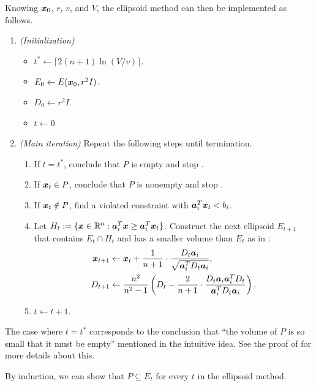 \begin{enumerate}
Knowing \(\bm{x}_0\), \(r\), \(v\), and \(V\), the ellipsoid method can then
be implemented as follows.
\begin{enumerate}[label={(\arabic*)}]
\item \emph{(Initialization)}
\begin{itemize}
\item \(t^{*}\leftarrow\lceil 2(n+1)\ln(V/v)\rceil\).
\item \(E_0\leftarrow E(\bm{x}_0,r^{2}I)\).
\item \(D_0\leftarrow r^{2}I\).
\item \(t\leftarrow 0\).
\end{itemize}
\item \emph{(Main iteration)} Repeat the following steps until termination.
\begin{enumerate}
\item If \(t=t^{*}\), conclude that \(P\) is empty and stop .
\item If \(\bm{x}_t\in P\), conclude that \(P\) is nonempty and stop
.
\item If \(\bm{x}_t\notin P\), find a violated constraint with
\(\bm{a}_i^{T}\bm{x}_t<b_i\).
\item Let
\(H_t:=\{\bm{x}\in\mathbb{R}^n:\bm{a}_i^{T}\bm{x}\ge\bm{a}_i^{T}\bm{x}_t\}\).
Construct the next ellipsoid \(E_{t+1}\) that contains \(E_t\cap H_t\) and has
a smaller volume than \(E_t\) as in :
\begin{align*}
\bm{x}_{t+1}&\leftarrow\bm{x}_{t}+\frac{1}{n+1}
\cdot \frac{D_t\bm{a}_i}{\sqrt{\bm{a}_i^{T}D_t\bm{a}_i}}, \\
D_{t+1}&\leftarrow\frac{n^{2}}{n^{2}-1}\left(D_t-\frac{2}{n+1}\cdot 
\frac{D_t\bm{a}_i\bm{a}_i^{T}D_t}{\bm{a}_i^{T}D_t\bm{a}_i}\right).
\end{align*}
\item \(t\leftarrow t+1\).
\end{enumerate}
\end{enumerate}
\begin{remark}
\item The case where \(t=t^{*}\) corresponds to the conclusion that ``the volume of
\(P\) is so small that it must be empty'' mentioned in the intuitive idea.  See
the proof of  for more details about this.
\item By induction, we can show that \(P\subseteq E_t\) for every \(t\) in the
ellipsoid method.


\end{remark}
\end{enumerate}
